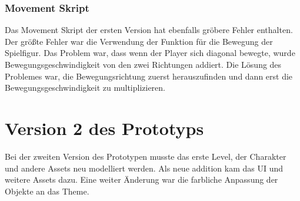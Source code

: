 \subsubsection{Movement Skript}
Das Movement Skript der ersten Version hat ebenfalls gröbere Fehler enthalten. Der größte Fehler war die Verwendung der Funktion für die Bewegung der Spielfigur. Das Problem war, dass wenn der Player sich diagonal bewegte, wurde Bewegungsgeschwindigkeit von den zwei Richtungen addiert. Die Lösung des Problemes war, die Bewegungsrichtung zuerst herauszufinden und dann erst die Bewegungsgeschwindigkeit zu multiplizieren.

\pagebreak

\section{Version 2 des Prototyps}

Bei der zweiten Version des Prototypen musste das erste Level, der Charakter und andere Assets neu modelliert werden. Als neue addition kam das UI und weitere Assets dazu. Eine weiter Änderung war die farbliche Anpassung der Objekte an das Theme. 

